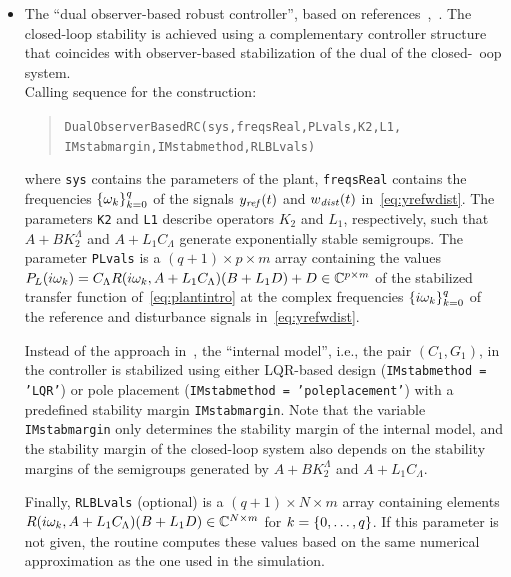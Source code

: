 \documentclass[11pt, a4paper]{amsart}
\newcommand{\CL}{C_\Lambda}
\theoremstyle{definition}
\numberwithin{equation}{section}
\newcommand{\yref}{y_{\mbox{\scriptsize\textit{ref}}}}
\newcommand{\wdist}{w_{\mbox{\scriptsize\textit{dist}}}}
\begin{document}
\begin{itemize}
  \item The ``dual observer-based robust controller'', based on references~,~. The closed-loop stability is achieved using a complementary controller structure that coincides with observer-based stabilization of the dual of the closed-~oop system.\\[1ex]
      Calling sequence for the construction:\\[-1ex]
     \begin{quotation}
       \texttt{DualObserverBasedRC(sys,freqsReal,PLvals,K2,L1,\\
	 \phantom{a}\hspace{2.7cm} IMstabmargin,IMstabmethod,RLBLvals)}
     \end{quotation}
     \medskip
     where \texttt{sys} contains the parameters of the plant, \texttt{freqsReal} contains the frequencies $\set{\gw_k}_{k=0}^q$ of the signals $\yref(t)$ and $\wdist(t)$ in~\eqref{eq:yrefwdist}. The parameters \texttt{K2} and \texttt{L1} describe operators $K_2$ and $L_1$, respectively, such that $A+BK_2^\Lambda$ and $A+L_1\CL$ generate exponentially stable semigroups. 
     The parameter \texttt{PLvals} is a $(q+1)\times p\times m$ array containing the values $P_L(i\gw_k)=\CL R(i\gw_k,A+L_1\CL)(B+L_1D)+D\in \C^{p\times m}$ of the stabilized transfer function of~\eqref{eq:plantintro} at the complex frequencies $\set{i\gw_k}_{k=0}^q$ of the reference and disturbance signals in~\eqref{eq:yrefwdist}.

     Instead of the approach in~\cite{Pau16a}, the ``internal model'', i.e., the pair $(C_1,G_1)$, in the controller is stabilized using either LQR-based design (\texttt{IMstabmethod = 'LQR'}) or pole placement (\texttt{IMstabmethod = 'poleplacement'}) with a predefined stability margin \texttt{IMstabmargin}. Note that the variable \texttt{IMstabmargin} only determines the stability margin of the internal model, and the stability margin of the closed-loop system also depends on the stability margins of the semigroups generated by $A+BK_2^\Lambda$ and $A+L_1\CL$.

     Finally, \texttt{RLBLvals} (optional) is a $(q+1)\times N\times m$ array containing elements $R(i\gw_k,A+L_1\CL)(B+L_1D)\in \C^{N\times m}$ for $k=\List[0]{q}$. If this parameter is not given, the routine computes these values based on the same numerical approximation as the one used in the simulation.



\end{itemize}
\end{document}
